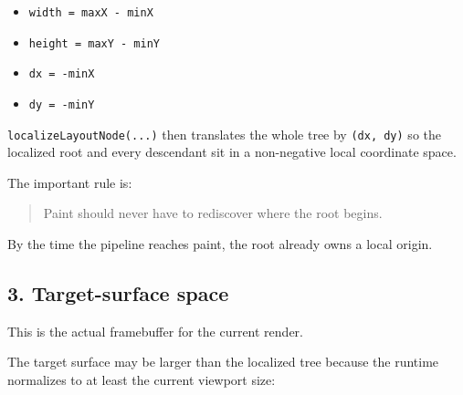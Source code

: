 \begin{itemize}
\tightlist
\item
  \texttt{w\allowbreak{}i\allowbreak{}d\allowbreak{}t\allowbreak{}h\allowbreak{} \allowbreak{}=\allowbreak{} \allowbreak{}m\allowbreak{}a\allowbreak{}x\allowbreak{}X\allowbreak{} \allowbreak{}-\allowbreak{} \allowbreak{}m\allowbreak{}i\allowbreak{}n\allowbreak{}X}
\item
  \texttt{h\allowbreak{}e\allowbreak{}i\allowbreak{}g\allowbreak{}h\allowbreak{}t\allowbreak{} \allowbreak{}=\allowbreak{} \allowbreak{}m\allowbreak{}a\allowbreak{}x\allowbreak{}Y\allowbreak{} \allowbreak{}-\allowbreak{} \allowbreak{}m\allowbreak{}i\allowbreak{}n\allowbreak{}Y}
\item
  \texttt{d\allowbreak{}x\allowbreak{} \allowbreak{}=\allowbreak{} \allowbreak{}-\allowbreak{}m\allowbreak{}i\allowbreak{}n\allowbreak{}X}
\item
  \texttt{d\allowbreak{}y\allowbreak{} \allowbreak{}=\allowbreak{} \allowbreak{}-\allowbreak{}m\allowbreak{}i\allowbreak{}n\allowbreak{}Y}
\end{itemize}

\texttt{l\allowbreak{}o\allowbreak{}c\allowbreak{}a\allowbreak{}l\allowbreak{}i\allowbreak{}z\allowbreak{}e\allowbreak{}L\allowbreak{}a\allowbreak{}y\allowbreak{}o\allowbreak{}u\allowbreak{}t\allowbreak{}N\allowbreak{}o\allowbreak{}d\allowbreak{}e\allowbreak{}(\allowbreak{}.\allowbreak{}.\allowbreak{}.\allowbreak{})} then translates the whole tree by \texttt{(\allowbreak{}d\allowbreak{}x\allowbreak{},\allowbreak{} \allowbreak{}d\allowbreak{}y\allowbreak{})} so the localized root and every descendant sit in a non-negative local coordinate space.

The important rule is:

\begin{quote}
Paint should never have to rediscover where the root begins.
\end{quote}

By the time the pipeline reaches paint, the root already owns a local origin.

\subsection{3. Target-surface space}\label{record-049-target-surface-space}

This is the actual framebuffer for the current render.

The target surface may be larger than the localized tree because the runtime normalizes to at least the current viewport size:

